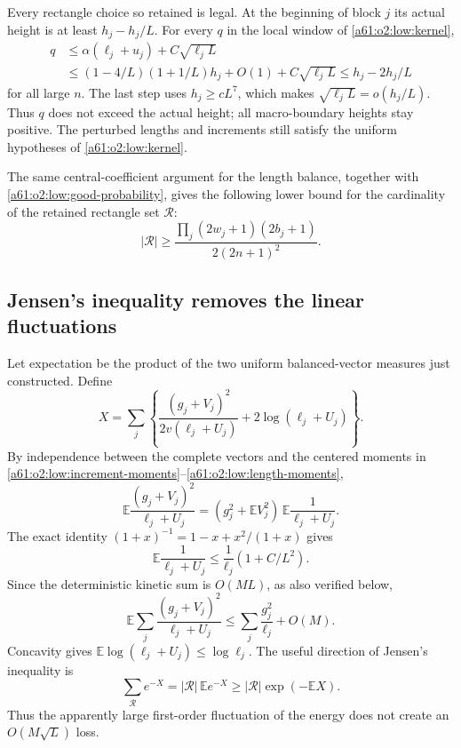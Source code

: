 \documentclass[11pt,letterpaper]{article}
\numberwithin{equation}{section}
\theoremstyle{remark}\newtheorem{remark}[theorem]{Remark}
\begin{document}
Every rectangle choice so retained is legal. At the beginning of
block $j$ its actual height is at least $h_j-h_j/L$. For every $q$ in
the local window of \eqref{a61:o2:low:kernel},
\begin{align*}
 q&\le\alpha(\ell_j+u_j)+C\sqrt{\ell_jL}\\
  &\le(1-4/L)(1+1/L)h_j+O(1)+C\sqrt{\ell_jL}
   \le h_j-2h_j/L
\end{align*}
for all large $n$. The last step uses $h_j\ge cL^7$, which makes
$\sqrt{\ell_jL}=o(h_j/L)$. Thus $q$ does not exceed the actual height;
all macro-boundary heights stay positive. The perturbed lengths and
increments still satisfy the uniform hypotheses of
\eqref{a61:o2:low:kernel}.

The same central-coefficient argument for the length balance,
together with \eqref{a61:o2:low:good-probability}, gives the following lower
bound for the cardinality of the retained rectangle set $\mathcal R$:
\begin{equation}\label{a61:o2:low:rectangles}
 |\mathcal R|\ge
 \frac{\prod_j(2w_j+1)(2b_j+1)}{2(2n+1)^2}.
\end{equation}

\subsection{Jensen's inequality removes the linear fluctuations}

Let expectation be the product of the two uniform balanced-vector
measures just constructed. Define
\[
 X=\sum_j\left\{
       \frac{(g_j+V_j)^2}{2v(\ell_j+U_j)}
       +2\log(\ell_j+U_j)\right\}.
\]
By independence between the complete vectors and the centered
moments in \eqref{a61:o2:low:increment-moments}--\eqref{a61:o2:low:length-moments},
\begin{equation}\label{a61:o2:low:factor-expectation}
 \mathbb E\frac{(g_j+V_j)^2}{\ell_j+U_j}
 =(g_j^2+\mathbb EV_j^2)\,
       \mathbb E\frac1{\ell_j+U_j}.
\end{equation}
The exact identity $(1+x)^{-1}=1-x+x^2/(1+x)$ gives
\[
 \mathbb E\frac1{\ell_j+U_j}
 \le\frac1{\ell_j}(1+C/L^2).
\]
Since the deterministic kinetic sum is $O(ML)$, as also verified below,
\begin{equation}\label{a61:o2:low:kinetic-expectation}
 \mathbb E\sum_j\frac{(g_j+V_j)^2}{\ell_j+U_j}
 \le\sum_j\frac{g_j^2}{\ell_j}+O(M).
\end{equation}
Concavity gives $\mathbb E\log(\ell_j+U_j)\le\log\ell_j$.
The useful direction of Jensen's inequality is
\[
 \sum_{\mathcal R}e^{-X}
   =|\mathcal R|\,\mathbb Ee^{-X}
   \ge|\mathcal R|\exp(-\mathbb EX).
\]
Thus the apparently large first-order fluctuation of the energy does
not create an $O(M\sqrt L)$ loss.
\end{document}
